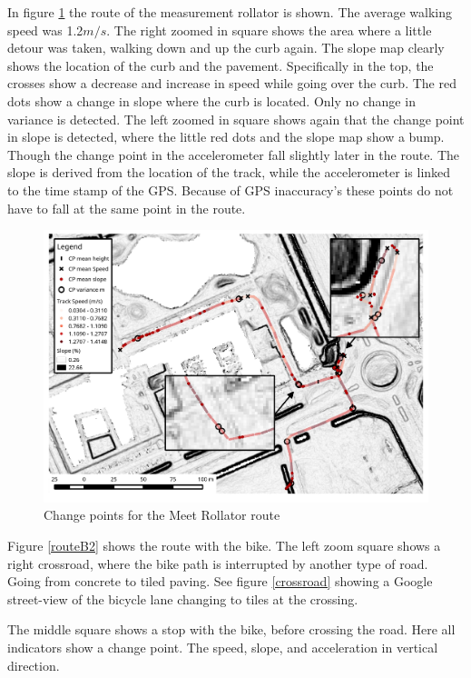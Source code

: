 	
In figure \ref{routeM} the route of the measurement rollator is shown. The average walking speed was 1.2$m/s$. The right zoomed in square shows the area where a little detour was taken, walking down and up the curb again. The slope map clearly shows the location of the curb and the pavement. Specifically in the top, the crosses show a decrease and increase in speed while going over the curb. The red dots show a change in slope where the curb is located. Only no change in variance is detected. The left zoomed in square shows again that the change point in slope is detected, where the little red dots and the slope map show a bump. Though the change point in the accelerometer fall slightly later in the route. 
The slope is derived from the location of the track, while the accelerometer is linked to the time stamp of the GPS. Because of GPS inaccuracy's these points do not have to fall at the same point in the route.

\begin{figure}[ht]
\includegraphics[width=\textwidth]{img/R_CP_Meetrollaterroute_Map.pdf}
\centering
\caption{Change points for the Meet Rollator route\label{routeM}}
\end{figure} 

Figure \ref{routeB2} shows the route with the bike. The left zoom square shows a right crossroad, where the bike path is interrupted by another type of road. Going from concrete to tiled paving. See figure \ref{crossroad} showing a Google street-view of the bicycle lane changing to tiles at the crossing.  

The middle square shows a stop with the bike, before crossing the road. Here all indicators show a change point. The speed, slope, and acceleration in vertical direction.

